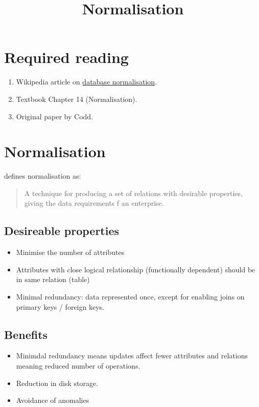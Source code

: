 \documentclass[slides]{pgnotes}
\title{Normalisation}
\begin{document}
\maketitle

\section{Required reading}\label{required-reading}

\begin{enumerate}
\item
  Wikipedia article on
  \href{https://en.wikipedia.org/wiki/Database_normalization}{database
  normalisation}.
\item
  Textbook \citep{connolly:2015:database} Chapter 14 (Normalisation).
\item
  Original paper by Codd.
\end{enumerate}

\section{Normalisation}\label{normalisation}

\citet{connolly:2015:database} defines normalisation as:

\begin{quote}
A technique for producing a set of relations with desirable properties,
giving the data requirements f an enterprise.
\end{quote}

\subsection{Desireable properties}

\begin{itemize}
\item
  Minimise the number of attributes
\item
  Attributes with close logical relationship (functionally dependent)
  should be in same relation (table)
\item
  Minimal redundancy: data represented once, except for enabling joins
  on primary keys / foreign keys.
\end{itemize}

\subsection{Benefits}

\begin{itemize}
\item
  Minimdal redundancy means updates affect fewer attributes and
  relations meaning reduced number of operations.
\item
  Reduction in disk storage.
\item
  Avoidance of anomalies
\end{itemize}
\end{document}
